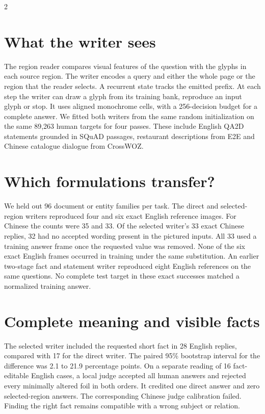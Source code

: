 \documentclass[10pt,a4paper]{article}
\begin{document}
\begin{multicols}{2}
\section*{What the writer sees}
The region reader compares visual features of the question with the glyphs in each source region. The writer encodes a query and either the whole page or the region that the reader selects. A recurrent state tracks the emitted prefix. At each step the writer can draw a glyph from its training bank, reproduce an input glyph or stop. It uses aligned monochrome cells, with a 256-decision budget for a complete answer. We fitted both writers from the same random initialization on the same 89,263 human targets for four passes. These include English QA2D statements grounded in SQuAD passages, restaurant descriptions from E2E and Chinese catalogue dialogue from CrossWOZ.
\section*{Which formulations transfer?}
We held out 96 document or entity families per task. The direct and selected-region writers reproduced four and six exact English reference images. For Chinese the counts were 35 and 33. Of the selected writer's 33 exact Chinese replies, 32 had no accepted wording present in the pictured inputs. All 33 used a training answer frame once the requested value was removed. None of the six exact English frames occurred in training under the same substitution. An earlier two-stage fact and statement writer reproduced eight English references on the same questions. No complete test target in these exact successes matched a normalized training answer.
\section*{Complete meaning and visible facts}
The selected writer included the requested short fact in 28 English replies, compared with 17 for the direct writer. The paired 95\% bootstrap interval for the difference was 2.1 to 21.9 percentage points. On a separate reading of 16 fact-editable English cases, a local judge accepted all human answers and rejected every minimally altered foil in both orders. It credited one direct answer and zero selected-region answers. The corresponding Chinese judge calibration failed. Finding the right fact remains compatible with a wrong subject or relation.
\end{multicols}
\smallskip{}\par\smallskip
\end{document}
